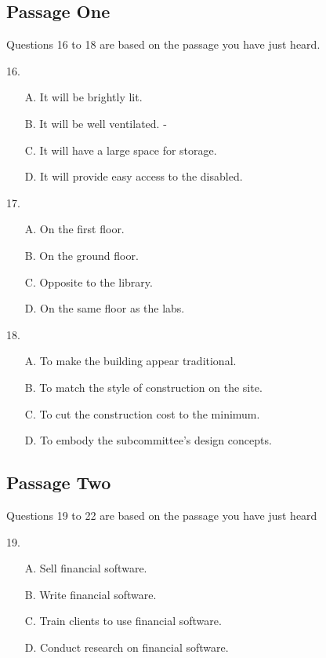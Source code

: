 \documentclass[UTF8,11pt]{ctexart}
\begin{document}
\subsection*{Passage One}


Questions 16 to 18 are based on the passage you have just heard.


16.


\begin{itemize}[leftmargin=2em,itemsep=.2em,topsep=.4em]\item[A.] It will be brightly lit.
\item[B.] It will be well ventilated. -
\item[C.] It will have a large space for storage.
\item[D.] It will provide easy access to the disabled.
\end{itemize}

17.


\begin{itemize}[leftmargin=2em,itemsep=.2em,topsep=.4em]\item[A.] On the first floor.
\item[B.] On the ground floor.
\item[C.] Opposite to the library.
\item[D.] On the same floor as the labs.
\end{itemize}

18.


\begin{itemize}[leftmargin=2em,itemsep=.2em,topsep=.4em]\item[A.] To make the building appear traditional.
\item[B.] To match the style of construction on the site.
\item[C.] To cut the construction cost to the minimum.
\item[D.] To embody the subcommittee’s design concepts.
\end{itemize}

\subsection*{Passage Two}


Questions 19 to 22 are based on the passage you have just heard


19.


\begin{itemize}[leftmargin=2em,itemsep=.2em,topsep=.4em]\item[A.] Sell financial software.
\item[B.] Write financial software.
\item[C.] Train clients to use financial software.
\item[D.] Conduct research on financial software.
\end{itemize}
\end{document}
